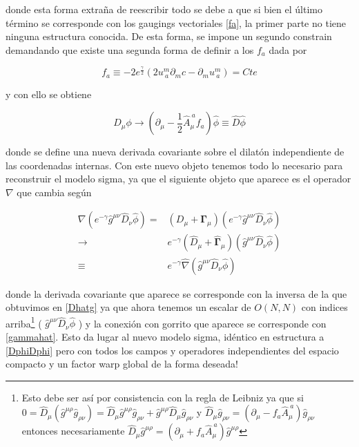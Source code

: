 \documentclass{article}
\numberwithin{equation}{section}
\begin{document}
donde esta forma extraña de reescribir todo se debe a que si bien el último término se corresponde con los gaugings vectoriales \ref{fa}, la primer parte no tiene ninguna estructura conocida. De esta forma, se impone un segundo constrain demandando que existe una segunda forma de definir a los $ f_a $ dada por

\begin{equation}
f_{a} \equiv -2e^{\frac{\gamma}{2}} \left( 2u^{m}_{\ a} \partial_{m}c - \partial_m u^{m}_{\ a} \right) = Cte
\end{equation}

y con ello se obtiene

\begin{equation}
D_{\mu} \phi \longrightarrow \left( \partial_{\mu} - \frac{1}{2} \hat{A}_{\mu}^{\ a} f_{a} \right) \hat{\phi} \equiv \hat{D}\hat{\phi}
\end{equation}

donde se define una nueva derivada covariante sobre el dilatón independiente de las coordenadas internas. Con este nuevo objeto tenemos todo lo necesario para reconstruir el modelo sigma, ya que el siguiente objeto que aparece es el operador $ \nabla $ que cambia según


\begin{equation}
\begin{aligned}
\nabla \left( e^{- \gamma} \hat{g}^{\mu \nu} \hat{D}_{\nu} \hat{\phi}\right) =& \left(D_{\mu} + \pmb{\Gamma}_{\mu}\right)\left( e^{- \gamma} \hat{g}^{\mu \nu} \hat{D}_{\nu} \hat{\phi}\right)\\
\longrightarrow& e^{- \gamma}\left( \hat{D}_{\mu} + \pmb{\hat{\Gamma}}_{\mu} \right) \left(\hat{g}^{\mu \nu} \hat{D}_{\nu} \hat{\phi}\right) \\
\equiv& e^{- \gamma} \hat{\nabla} \left(\hat{g}^{\mu \nu} \hat{D}_{\nu} \hat{\phi}\right)
\end{aligned}
\end{equation}

donde la derivada covariante que aparece se corresponde con la inversa de la que obtuvimos en \ref{Dhatg} ya que ahora tenemos un escalar de $ O(N,N) $ con indices arriba\footnote{ Esto debe ser así por consistencia con la regla de Leibniz ya que si $ 0 = \hat{D}_{\mu} (\hat{g}^{\mu \rho} \hat{g}_{\rho \nu}) = \hat{D}_{\mu}\hat{g}^{\mu \rho} \hat{g}_{\rho \nu} + \hat{g}^{\mu \rho} \hat{D}_{\mu} \hat{g}_{\rho \nu} $ y $ \hat{D}_{\mu} \hat{g}_{\rho \nu} = \left(\partial_{\mu} - f_{a} \hat{A}_{\mu}^{\ a}\right) \hat{g}_{\rho \nu} $ entonces necesariamente $  \hat{D}_{\mu}\hat{g}^{\mu \rho} = \left(\partial_{\mu} + f_{a} \hat{A}_{\mu}^{\ a}\right)\hat{g}^{\mu \rho} $ } ( $ \hat{g}^{\mu \nu} \hat{D}_{\nu} \hat{\phi} $ ) y la conexión con gorrito que aparece se corresponde con \ref{gammahat}. Esto da lugar al nuevo modelo sigma, idéntico en estructura a \ref{DphiDphi} pero con todos los campos y operadores independientes del espacio compacto y un factor warp global de la forma deseada!\\
 
\end{document}
